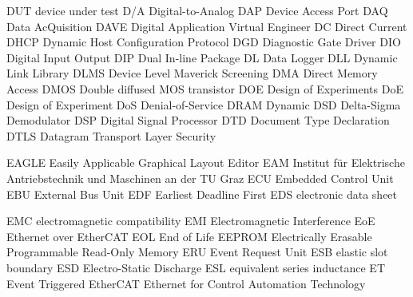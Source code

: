		{DUT}		{device under test}
			{D/A}		{Digital-to-Analog}
		{DAP}		{Device Access Port}
		{DAQ}		{Data AcQuisition}
		{DAVE}		{Digital Application Virtual Engineer}
			{DC}		{Direct Current}
		{DHCP}		{Dynamic Host Configuration Protocol}
		{DGD}		{Diagnostic Gate Driver}
		{DIO}		{Digital Input Output}
		{DIP}		{Dual In-line Package}
			{DL}		{Data Logger}
		{DLL}		{Dynamic Link Library}
		{DLMS}		{Device Level Maverick Screening}
		{DMA}		{Direct Memory Access}
		{DMOS}		{Double diffused {\acrshort{MOS}} transistor}
		{DOE}		{Design of Experiments}
		{DoE}		{Design of Experiment}
		{DoS}		{Denial-of-Service}
		{DRAM}		{Dynamic {}}
		{DSD}		{Delta-Sigma Demodulator}
		{DSP}		{Digital Signal Processor}
		{DTD}		{Document Type Declaration}
		{DTLS}		{Datagram Transport Layer Security}

		{EAGLE}		{Easily Applicable Graphical Layout Editor}
		{EAM}		{Institut für Elektrische Antriebstechnik und Maschinen an der TU Graz}
		{ECU}		{Embedded Control Unit}
		{EBU}		{External Bus Unit}
		{EDF}		{Earliest Deadline First}
		{EDS}		{electronic data sheet}

		{EMC}		{electromagnetic compatibility}
		{EMI}		{Electromagnetic Interference}
		{EoE}		{Ethernet over EtherCAT}
		{EOL}		{End of Life}
		{EEPROM}	{Electrically Erasable Programmable Read-Only Memory }
		{ERU}		{Event Request Unit}
		{ESB}		{elastic slot boundary}
		{ESD}		{Electro-Static Discharge}
		{ESL}		{equivalent series inductance}
			{ET}		{Event Triggered}
	{EtherCAT}	{Ethernet for Control Automation Technology}

